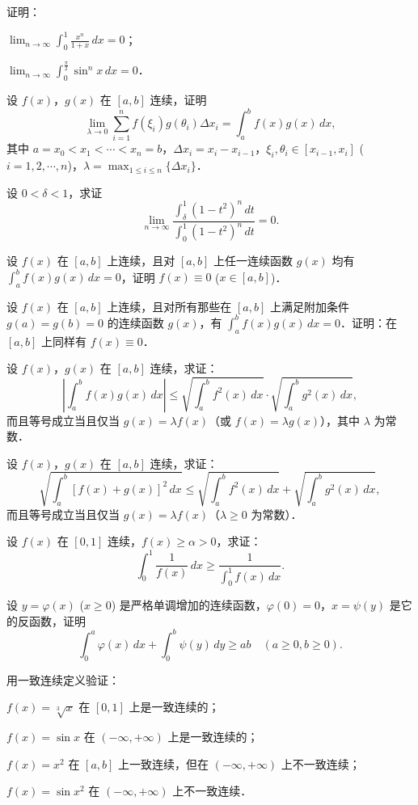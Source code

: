 \begin{xiti}
\item 证明：
\begin{ziti}
\item $\displaystyle \lim_{n \to \infty} \int_0^1 \frac{x^n}{1 + x} \, dx = 0$；
\item $\displaystyle \lim_{n \to \infty} \int_0^{\frac{\pi}{2}} \sin^n x \, dx = 0$．
\end{ziti}

\item 设 $f(x)$，$g(x)$ 在 $[a,b]$ 连续，证明
\[
\lim_{\lambda \to 0}\sum_{i=1}^n f(\xi_i)g(\theta_i)\Delta x_i = \int_a^b f(x)g(x)\,dx,
\]
其中 $a = x_0 < x_1 < \cdots < x_n = b$，$\Delta x_i = x_i - x_{i-1}$，$\xi_i, \theta_i \in [x_{i-1}, x_i]$ ($i = 1, 2, \cdots, n$)，$\lambda = \max_{1 \leqslant i \leqslant n}\{\Delta x_i\}$．

\item 设 $0 < \delta < 1$，求证
\[
\lim_{n \to \infty}\frac{\displaystyle \int_\delta^1 (1 - t^2)^n \, dt}{\displaystyle \int_0^1 (1 - t^2)^n \, dt} = 0.
\]

\item 
\begin{ziti}
\item 设 $f(x)$ 在 $[a,b]$ 上连续，且对 $[a,b]$ 上任一连续函数 $g(x)$ 均有 $\int_a^b f(x)g(x)\,dx = 0$，证明 $f(x) \equiv 0$ ($x \in [a,b]$)．
\item 设 $f(x)$ 在 $[a,b]$ 上连续，且对所有那些在 $[a,b]$ 上满足附加条件 $g(a) = g(b) = 0$ 的连续函数 $g(x)$，有 $\int_a^b f(x)g(x)\,dx = 0$．证明：在 $[a,b]$ 上同样有 $f(x) \equiv 0$．
\end{ziti}

\item 设 $f(x)$，$g(x)$ 在 $[a,b]$ 连续，求证：
\[
\left|\int_a^b f(x)g(x)\,dx\right| \leqslant \sqrt{\int_a^b f^2(x)\,dx} \cdot \sqrt{\int_a^b g^2(x)\,dx},
\]
而且等号成立当且仅当 $g(x) = \lambda f(x)$（或 $f(x) = \lambda g(x)$），其中 $\lambda$ 为常数．

\item 设 $f(x)$，$g(x)$ 在 $[a,b]$ 连续，求证：
\[
\sqrt{\int_a^b \left[f(x) + g(x)\right]^2 \, dx} \leqslant \sqrt{\int_a^b f^2(x)\,dx} + \sqrt{\int_a^b g^2(x)\,dx},
\]
而且等号成立当且仅当 $g(x) = \lambda f(x)$（$\lambda \geqslant 0$ 为常数）．

\item 设 $f(x)$ 在 $[0,1]$ 连续，$f(x) \geqslant \alpha > 0$，求证：
\[
\int_0^1 \frac{1}{f(x)}\,dx \geqslant \frac{1}{\int_0^1 f(x)\,dx}.
\]

\item 设 $y = \varphi(x)$ ($x \geqslant 0$) 是严格单调增加的连续函数，$\varphi(0) = 0$，$x = \psi(y)$ 是它的反函数，证明
\[
\int_0^a \varphi(x)\,dx + \int_0^b \psi(y)\,dy \geqslant ab \quad (a \geqslant 0, b \geqslant 0).
\]

\item 用一致连续定义验证：
\begin{ziti}
\item $f(x) = \sqrt[3]{x}$ 在 $[0,1]$ 上是一致连续的；
\item $f(x) = \sin x$ 在 $(-\infty, +\infty)$ 上是一致连续的；
\item $f(x) = x^2$ 在 $[a,b]$ 上一致连续，但在 $(-\infty, +\infty)$ 上不一致连续；
\item $f(x) = \sin x^2$ 在 $(-\infty, +\infty)$ 上不一致连续．
\end{ziti}
\end{xiti}
